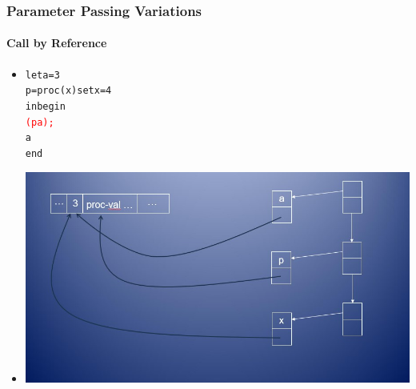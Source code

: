 \documentclass{beamer}
\begin{document}
\begin{frame}[fragile]
\frametitle{Parameter Passing Variations}
\framesubtitle{Call by Reference}
\begin{scriptsize}
\begin{itemize}
\item<1->
\begin{alltt}
let a = 3
	p = proc (x) set x = 4
in begin
    \textcolor{red}{(p a);}
    a
   end
\end{alltt}

\item<1->
\begin{center}
  \includegraphics[scale=0.5]{cbr3.jpg}
\end{center}

\end{itemize}
\end{scriptsize}
\end{frame}
\end{document}
